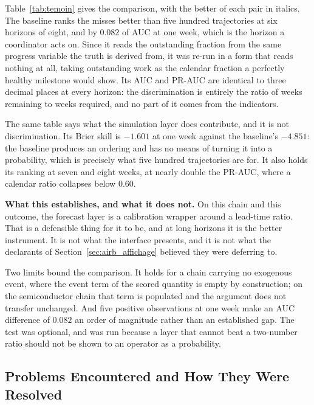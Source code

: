 Table~\ref{tab:temoin} gives the comparison, with the better of each pair in italics. The
baseline ranks the misses better than five hundred trajectories at six horizons of eight, and
by $0.082$ of AUC at one week, which is the horizon a coordinator acts on. Since it reads the
outstanding fraction from the same progress variable the truth is derived from, it was re-run
in a form that reads nothing at all, taking outstanding work as the calendar fraction a
perfectly healthy milestone would show. Its AUC and PR-AUC are identical to three decimal
places at every horizon: the discrimination is entirely the ratio of weeks remaining to weeks
required, and no part of it comes from the indicators.

The same table says what the simulation layer does contribute, and it is not discrimination.
Its Brier skill is $-1.601$ at one week against the baseline's $-4.851$: the baseline produces
an ordering and has no means of turning it into a probability, which is precisely what five
hundred trajectories are for. It also holds its ranking at seven and eight weeks, at nearly
double the PR-AUC, where a calendar ratio collapses below $0.60$.

\begin{attentionBox}
\noindent\textbf{What this establishes, and what it does not.} On this chain and this
outcome, the forecast layer is a calibration wrapper around a lead-time ratio. That is a
defensible thing for it to be, and at long horizons it is the better instrument. It is not
what the interface presents, and it is not what the declarants of
Section~\ref{sec:airb_affichage} believed they were deferring to. 
\end{attentionBox}

Two limits bound the comparison. It holds for a chain carrying no exogenous event, where the
event term of the scored quantity is empty by construction; on the semiconductor chain that
term is populated and the argument does not transfer unchanged. And five positive observations
at one week make an AUC difference of $0.082$ an order of magnitude rather than an established
gap. The test was optional, and was run because a layer that cannot beat a two-number ratio
should not be shown to an operator as a probability.

\subsection{Problems Encountered and How They Were Resolved}
\label{sec:problemes}

